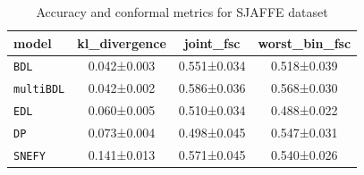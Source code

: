 \begin{table}[h]
\centering
\caption{Accuracy and conformal metrics for SJAFFE dataset}
\label{tab:sjaffe_accuracy}

\begin{tabular}{lccc}
\toprule
\textbf{model} & \textbf{kl\_divergence} & \textbf{joint\_fsc} & \textbf{worst\_bin\_fsc} \\
\midrule
\texttt{BDL} & 0.042±0.003 & 0.551±0.034 & 0.518±0.039 \\
\texttt{multiBDL} & 0.042±0.002 & 0.586±0.036 & 0.568±0.030 \\
\texttt{EDL} & 0.060±0.005 & 0.510±0.034 & 0.488±0.022 \\
\texttt{DP} & 0.073±0.004 & 0.498±0.045 & 0.547±0.031 \\
\texttt{SNEFY} & 0.141±0.013 & 0.571±0.045 & 0.540±0.026 \\
\bottomrule
\end{tabular}

\end{table}